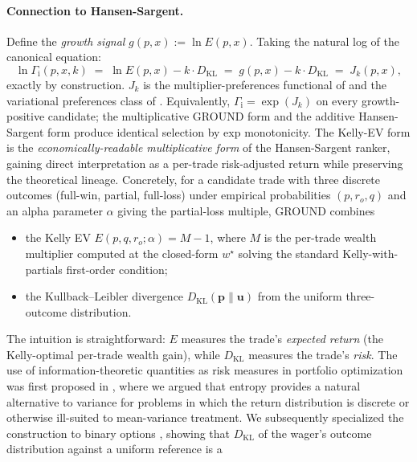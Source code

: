 \documentclass[11pt]{article}
\newcommand{\GROUND}{\Gamma_{\mathrm{i}}}
\begin{document}
\paragraph{Connection to Hansen-Sargent.}
Define the \emph{growth signal} $g(p, x) := \ln E(p, x)$. Taking the
natural log of the canonical equation:
\begin{equation*}
\ln \GROUND(p, x, k) \;=\; \ln E(p, x) - k \cdot D_{\mathrm{KL}}
\;=\; g(p, x) - k \cdot D_{\mathrm{KL}}
\;=\; J_k(p, x),
\end{equation*}
exactly by construction. $J_k$ is the multiplier-preferences functional
of \citet{hansen2008robustness} and the variational preferences class
of \citet{maccheroni2006ambiguity}. Equivalently, $\GROUND = \exp(J_k)$
on every growth-positive candidate; the multiplicative GROUND form and
the additive Hansen-Sargent form produce identical selection by exp
monotonicity. The Kelly-EV form is the \emph{economically-readable
multiplicative form} of the Hansen-Sargent ranker, gaining direct
interpretation as a per-trade risk-adjusted return while preserving the
theoretical lineage. Concretely,
for a candidate trade with three discrete outcomes (full-win, partial,
full-loss) under empirical probabilities $(p, r_o, q)$ and an alpha
parameter $\alpha$ giving the partial-loss multiple, GROUND combines
\begin{itemize}
    \item the Kelly EV $E(p, q, r_o; \alpha) = M - 1$, where $M$ is the
        per-trade wealth multiplier computed at the closed-form
        $w^\star$ solving the standard Kelly-with-partials first-order
        condition;
    \item the Kullback--Leibler divergence
        $D_{\mathrm{KL}}(\mathbf{p} \| \mathbf{u})$ from the uniform
        three-outcome distribution.
\end{itemize}
The intuition is straightforward: $E$ measures the trade's
\emph{expected return} (the Kelly-optimal per-trade wealth gain), while
$D_{\mathrm{KL}}$ measures the trade's \emph{risk}. The use of
information-theoretic quantities as risk measures in portfolio
optimization was first proposed in \citet{mercurio2020portfolio},
where we argued that entropy provides a natural alternative to
variance for problems in which the return distribution is discrete or
otherwise ill-suited to mean-variance treatment. We subsequently
specialized the construction to binary options
\citep{mercurio2020binary}, showing that $D_{\mathrm{KL}}$ of the
wager's outcome distribution against a uniform reference is a
\end{document}
